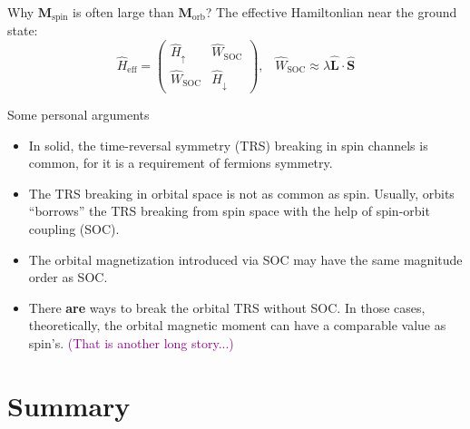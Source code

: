 \documentclass{beamer}
\newcommand{\purple}{\textcolor{purple}}
\begin{document}
    \begin{frame}{Why \(\bm{M}_{\text{spin}}\) is often large than \(\bm{M}_{\text{orb}}\)?}\small
      The effective Hamiltonlian near the ground state:
      \begin{equation}
        \widehat{H}_{\text{eff}} = \begin{pmatrix}
          \widehat{H}_{\uparrow} & \widehat{W}_{\text{SOC}}\\
         \widehat{W}_{\text{SOC}} & \widehat{H}_{\downarrow}
         \end{pmatrix}, \;\;\; \widehat{W}_{\text{SOC}} \approx \lambda\widehat{\bm{L}}\cdot\widehat{\bm{S}}
      \end{equation}
      \begin{block}{Some personal arguments}
        \begin{itemize}
          \item In solid, the time-reversal symmetry (TRS) breaking in spin channels is common, for it is a requirement of fermions symmetry.
          \item The TRS breaking in orbital space is not as common as spin. Usually, orbits ``borrows'' the TRS breaking from spin space with the help of spin-orbit coupling (SOC).
          \item The orbital magnetization introduced via SOC may have the same magnitude order as SOC.
          \item There \textbf{are} ways to break the orbital TRS without SOC. In those cases, theoretically, the orbital magnetic moment can have a comparable value as spin's. \purple{(That is another long story...)}
        \end{itemize}
      \end{block}
    \end{frame}

    \section{Summary}
\end{document}

